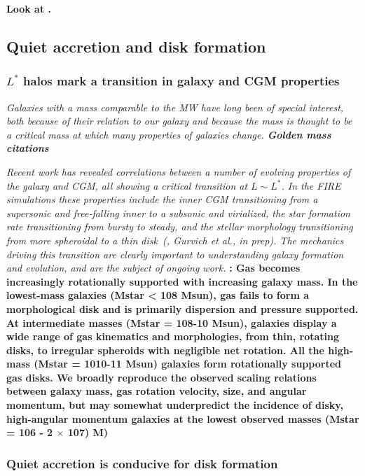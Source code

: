 \documentclass[fleqn,usenatbib]{mnras}
\begin{document}
\textbf{Look at \cite{Dekel2014}.}

\subsection{Quiet accretion and disk formation}
\label{s: disk formation}

\subsubsection{$L^*$ halos mark a transition in galaxy and CGM properties}

\textit{
Galaxies with a mass comparable to the MW have long been of special interest, both because of their relation to our galaxy and because the mass is thought to be a critical mass at which many properties of galaxies change.
\textbf{Golden mass citations}
}

\textit{
Recent work has revealed correlations between a number of evolving properties of the galaxy and CGM, all showing a critical transition at $L \sim L^*$.
In the FIRE simulations these properties include the inner CGM transitioning from a supersonic and free-falling inner to a subsonic and virialized, the star formation rate transitioning from bursty to steady, and the stellar morphology transitioning from more spheroidal to a thin disk~(\citealt{Stern2020, Yu2021}, Gurvich et al., in prep).
The mechanics driving this transition are clearly important to understanding galaxy formation and evolution, and are the subject of ongoing work.
}
\textbf{
\cite{El-Badry2018a}:
Gas becomes increasingly rotationally supported with increasing galaxy mass. In the lowest-mass galaxies (Mstar < 108 Msun), gas fails to form a morphological disk and is primarily dispersion and pressure supported.
At intermediate masses (Mstar = 108-10 Msun), galaxies display a wide range of gas kinematics and morphologies, from thin, rotating disks, to irregular spheroids with negligible net rotation.
All the high-mass (Mstar = 1010-11 Msun) galaxies form rotationally supported gas disks.
We broadly reproduce the observed scaling relations between galaxy mass, gas rotation velocity, size, and angular momentum, but may somewhat underpredict the incidence of disky, high-angular momentum galaxies at the lowest observed masses (Mstar = 106 - 2 $\times$ 107) M)
}

\subsubsection{Quiet accretion is conducive for disk formation}
\end{document}
